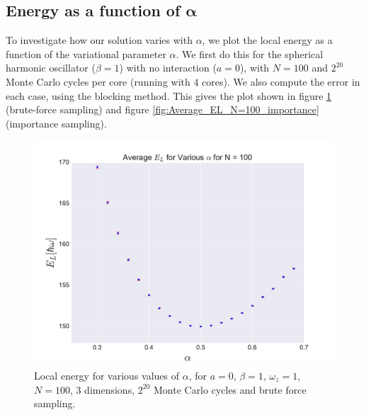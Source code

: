 \documentclass[a4paper, 10pt]{article}
\begin{document}
	\subsection{Energy as a function of $\boldsymbol{\alpha}$}
	To investigate how our solution varies with $\alpha$, we plot the local energy as a function of the variational parameter $\alpha$. We first do this for the spherical harmonic oscillator ($\beta=1$) with no interaction ($a=0$), with $N=100$ and $2^{20}$ Monte Carlo cycles per core (running with $4$ cores). We also compute the error in each case, using the blocking method. This gives the plot shown in figure \ref{fig:Average_EL_N=100_brute_force} (brute-force sampling) and figure \ref{fig:Average_EL_N=100_importance} (importance sampling).
	\begin{figure}[ht!]
		\centering
		\includegraphics[scale=0.8]{../Results/N100ax20/EvAlphaN100.pdf}
		\caption{Local energy for various values of $\alpha$, for $a=0$, $\beta=1$, $\omega_z=1$, $N=100$, 3 dimensions, $2^{20}$ Monte Carlo cycles and brute force sampling.}\label{fig:Average_EL_N=100_brute_force}
	\end{figure}	
\end{document}

